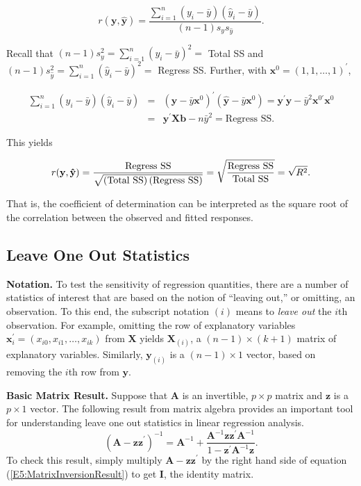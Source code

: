 \begin{center}
\[
r(\mathbf{y,\hat{y}})=\frac{\sum_{i=1}^{n}(y_i-\bar{y})(\hat{y}_i-\bar{y}%
)}{(n-1)s_{y}s_{\hat{y}}}.
\]
\end{center}
Recall that $(n-1)s_{y}^2=\sum_{i=1}^{n}(y_i-\bar{y})^2=$ Total SS and $%
(n-1)s_{\hat{y}}^2=\sum_{i=1}^{n}(\hat{y}_i-\bar{y})^2=$ Regress SS.
Further, with $\mathbf{x}^{0}=(1,1,\ldots,1)^{\prime}$,
\begin{center}
\begin{eqnarray*}
\sum_{i=1}^{n}(y_i-\bar{y})(\hat{y}_i-\bar{y}) &=&(\mathbf{y}-\bar{y}%
\mathbf{x}^{0})^{\prime}(\mathbf{\hat{y}}-\bar{y}\mathbf{x}^{0})=\mathbf{y}%
^{\prime}\mathbf{\hat{y}}-\bar{y}^2\mathbf{x}^{0\prime }\mathbf{x}^{0} \\
&=&\mathbf{y}^{\prime}\mathbf{Xb}-n\bar{y}^2=\text{Regress SS.}
\end{eqnarray*}
\end{center}
This yields
\begin{center}
\[
r(\mathbf{y,\hat{y}})=\frac{\text{Regress SS}}{\sqrt{\left( \text{Total SS}%
\right) \left( \text{Regress SS}\right) }}=\sqrt{\frac{\text{Regress SS}}{%
\text{Total SS}}}=\sqrt{R^2}.
\]
\end{center}
That is, the coefficient of determination can be interpreted as the
square root of the correlation between the observed and fitted
responses.

\subsection{Leave One Out Statistics}

\textbf{Notation.} To test the sensitivity of regression quantities,
there are a number of statistics of interest that are based on the
notion of ``leaving out,'' or omitting, an observation. To this end,
the subscript notation $(i)$ means to \textit{leave out} the $i$th
observation. For example, omitting the row of explanatory variables
$\mathbf{x}_i^{\prime}=(x_{i0},x_{i1},\dots,x_{ik})$ from
$\mathbf{X}$ yields $\mathbf{X}_{(i)}$, a
$(n-1)\times (k+1)$ matrix of explanatory variables. Similarly, $\mathbf{y}%
_{(i)}$ is a $(n-1)\times 1$ vector, based on removing the $i$th row from $%
\mathbf{y}$.

\textbf{Basic Matrix Result.} Suppose that $\mathbf{A}$ is an invertible, $%
p\times p$ matrix and $\mathbf{z}$ is a $p\times 1$ vector. The
following result from matrix algebra provides an important tool for
understanding leave one out statistics in linear regression
analysis.
\begin{equation}\label{E5:MatrixInversionResult}
\left( \mathbf{A-zz}^{\prime}\right) ^{-1}=\mathbf{A}^{-1}+\frac{\mathbf{A}%
^{-1}\mathbf{zz}^{\prime}\mathbf{A}^{-1}}{1-\mathbf{z}^{\prime}\mathbf{A}%
^{-1}\mathbf{z}}.
\end{equation}
To check this result, simply multiply $\mathbf{A-zz}^{\prime}$ by
the right hand side of equation (\ref{E5:MatrixInversionResult}) to
get $\mathbf{I}$, the identity matrix.


